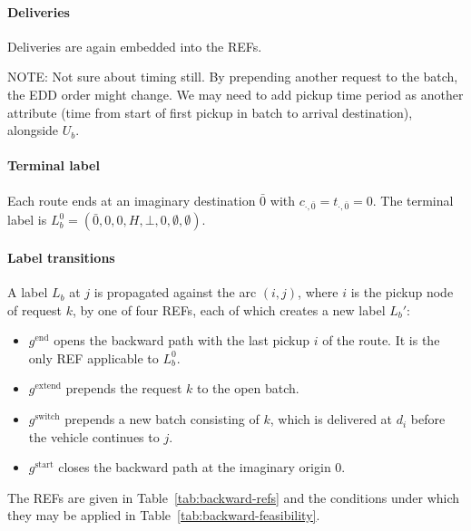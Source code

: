 \documentclass[preprint,11pt,authoryear]{elsarticle}
\begin{document}
\paragraph{Deliveries}
Deliveries are again embedded into the REFs.

NOTE: Not sure about timing still. By prepending another request to the batch, the EDD order might 
change. We may need to add pickup time period as another attribute (time from start of first pickup in batch 
to arrival destination), alongside $U_b$. 

\paragraph{Terminal label}
Each route ends at an imaginary destination $\bar 0$ with $c_{\cdot,\bar 0} = t_{\cdot,\bar 0} = 0$.
The terminal label is $L_b^0 = (\bar 0, 0, 0, H, \bot, 0, \emptyset, \emptyset)$.

\paragraph{Label transitions}
A label $L_b$ at $j$ is propagated against the arc $(i,j)$, where $i$ is the pickup node of 
request $k$, by one of four REFs, each of which creates a new label $L_b'$: 
\begin{itemize}
  \item $g^{\mathrm{end}}$ opens the backward path with the last pickup $i$ of the route. It is
        the only REF applicable to $L_b^0$.
  \item $g^{\mathrm{extend}}$ prepends the request $k$ to the open batch.
  \item $g^{\mathrm{switch}}$ prepends a new batch consisting of $k$, which is delivered at $d_i$
        before the vehicle continues to $j$.
  \item $g^{\mathrm{start}}$ closes the backward path at the imaginary origin $0$.
\end{itemize}
The REFs are given in Table~\ref{tab:backward-refs} and the conditions under which they may be
applied in Table~\ref{tab:backward-feasibility}.


\newpage
\end{document}
